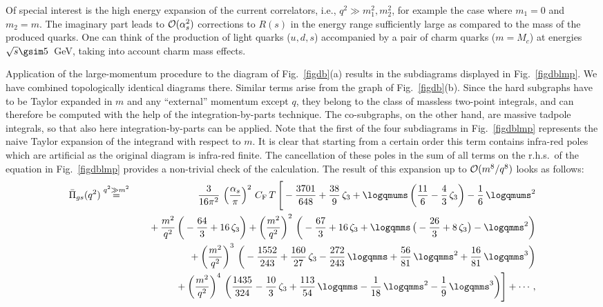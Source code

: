 Of special interest is the high energy expansion of the current
correlators, i.e., $q^2\gg m_1^2,m_2^2$, for example the case where $m_1=0$ and
$m_2=m$.  The imaginary part leads to ${\cal O}(\alpha_s^2)$ corrections
to $R(s)$ in the energy range sufficiently large as compared to the mass of
the produced quarks. One can think of the production of light quarks
($u,d,s$) accompanied by a pair of charm quarks ($m=M_c$) at energies
$\sqrt{s}\gsim5$~GeV, taking into account charm mass effects.

Application of the large-momentum procedure to the diagram of
Fig.~\ref{figdb}(a) results in the subdiagrams displayed in
Fig.~\ref{figdblmp}. We have combined topologically identical diagrams
there. Similar terms arise from the graph of Fig.~\ref{figdb}(b). Since
the hard subgraphs have to be Taylor expanded in $m$ and any
``external'' momentum except $q$, they belong to the class of massless
two-point integrals, and can therefore be computed with the help of the
integration-by-parts technique.  The co-subgraphs, on the other hand,
are massive tadpole integrals, so that also here integration-by-parts
can be applied.  Note that the first of the four subdiagrams in
Fig.~\ref{figdblmp} represents the naive Taylor expansion of the
integrand with respect to $m$. It is clear that starting from a certain
order this term contains infra-red poles which are artificial as the
original diagram is infra-red finite.  The cancellation of these poles
in the sum of all terms on the r.h.s.\ of the equation in
Fig.~\ref{figdblmp} provides a non-trivial check of the
calculation.  The result of this expansion up to ${\cal O}(m^8/q^8)$
looks as follows:
\begin{eqnarray}
\bar{\Pi}_{gs}(q^2) &\stackrel{q^2\gg m^2}{=}&
  {3\over 16\pi^2}\,
  \left({\alpha_s\over \pi}\right)^2\,C_{\rm F}\,T\,\Bigg[
      -{3701\over 648} 
      + {38\over 9}\,\zeta_3 
                + \logqmums\,\bigg(
          {11\over 6} 
          - {4\over 3}\,\zeta_3
          \bigg) 
      - {1\over 6}\,\logqmums^2 
\nonumber\\&&\mbox{\hspace{1em}} 
      + {m^2\over q^2}\,\bigg(
          -{64\over 3} 
          + 16\,\zeta_3
          \bigg) 
      + \left({m^2\over q^2}\right)^2\,\bigg(
          -{67\over 3} 
          + 16\,\zeta_3 
          + \logqmms\,\big(
              -{26\over 3} 
              + 8\,\zeta_3
              \big)
          - \logqmms^2 
          \bigg)
\nonumber\\&&\mbox{\hspace{1em}} 
      + \left({m^2\over q^2}\right)^3\,\bigg(
          -{1552\over 243} 
          + {160\over 27}\,\zeta_3
          - {272\over 243}\,\logqmms 
          + {56\over 81}\,\logqmms^2 
          + {16\over 81}\,\logqmms^3 
          \bigg) 
\nonumber\\&&\mbox{\hspace{1em}} 
      + \left({m^2\over q^2}\right)^4\,\bigg(
          {1435\over 324} 
          - {10\over 3}\,\zeta_3
          + {113\over 54}\,\logqmms 
          - {1\over 18}\,\logqmms^2 
          - {1\over 9}\,\logqmms^3 
          \bigg) 
      \Bigg] + \cdots\,,
\label{eqdblmpres}
\end{eqnarray}
